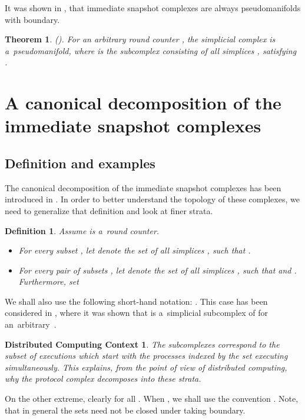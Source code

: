 \documentclass{amsart}[10pt]
\newtheorem{df}[theorem]{Definition}
\newtheorem{thm}[theorem]{Theorem} \newtheorem{lemma}[theorem]{Lemma}
\newtheorem{dcc}[theorem]{Distributed Computing Context}
\numberwithin{equation}{section}
\numberwithin{figure}{section}
\numberwithin{table}{section}
\begin{document}
It was shown in \cite{k1}, that immediate snapshot complexes are
always pseudomanifolds with boundary.

\begin{thm}\label{prop:pseudo} {\rm (\cite[Proposition 5.9]{k1}).}
For an arbitrary round counter , the simplicial complex 
is a~pseudomanifold, where  is the subcomplex
consisting of all simplices ,
satisfying .
\end{thm}

\section{A canonical decomposition of the immediate snapshot complexes}

\subsection{Definition and examples}


\nin The canonical decomposition of the immediate snapshot complexes has
been introduced in \cite{k1}. In order to better understand the
topology of these complexes, we need to generalize that definition and
look at finer strata.

\begin{df}
Assume  is a~round counter.
\begin{itemize}
\item For every subset , let  denote the set
  of all simplices , such
  that .
\item For every pair of subsets , let
   denote the set of all simplices
  , such that  and
  . Furthermore, set 
\end{itemize} 
\end{df}

We shall also use the following short-hand notation:
. This case has been considered in \cite{k1},
where it was shown that  is a~simplicial subcomplex of 
for an~arbitrary~.

\begin{dcc}
The subcomplexes  correspond to the subset of executions which
start with the processes indexed by the set  executing
simultaneously.  This explains, from the point of view of distributed
computing, why the protocol complex decomposes into these strata.
\end{dcc}

On the other extreme, clearly  for all .  When
, we shall use the convention .  Note,
that in general the sets  need not be closed under taking
boundary.
\end{document}
